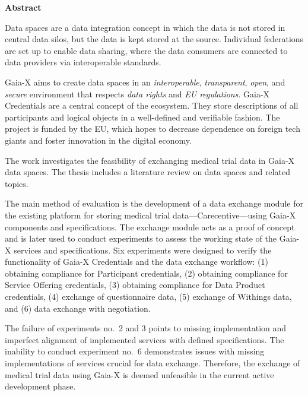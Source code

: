 \documentclass{maddoc}
\begin{document}
\vspace{5.0cm}

\begin{center}
\bfseries
Abstract
\normalfont
\end{center}

Data spaces are a data integration concept in which the data is not stored in central data silos, but the data is kept stored at the source.
Individual federations are set up to enable data sharing, where the data consumers are connected to data providers via interoperable standards.

Gaia-X aims to create data spaces in an \textit{interoperable}, \textit{transparent}, \textit{open}, and \textit{secure} environment that respects \textit{data rights} and \textit{EU regulations}.
Gaia-X Credentials are a central concept of the ecosystem.
They store descriptions of all participants and logical objects in a well-defined and verifiable fashion.
The project is funded by the EU, which hopes to decrease dependence on foreign tech giants and foster innovation in the digital economy.

The work investigates the feasibility of exchanging medical trial data in Gaia-X data spaces.
The thesis includes a literature review on data spaces and related topics.

The main method of evaluation is the development of a data exchange module for the existing platform for storing medical trial data---Carecentive---using Gaia-X components and specifications.
The exchange module acts as a proof of concept and is later used to conduct experiments to assess the working state of the Gaia-X services and specifications.
Six experiments were designed to verify the functionality of Gaia-X Credentials and the data exchange workflow: (1) obtaining compliance for Participant credentials, (2) obtaining compliance for Service Offering credentials, (3) obtaining compliance for Data Product credentials, (4) exchange of questionnaire data, (5) exchange of Withings data, and (6) data exchange with negotiation.

The failure of experiments no.~2 and 3 points to missing implementation and imperfect alignment of implemented services with defined specifications.
The inability to conduct experiment no.~6 demonstrates issues with missing implementations of services crucial for data exchange.
Therefore, the exchange of medical trial data using Gaia-X is deemed unfeasible in the current active development phase.


\tableofcontents
\cleardoublepage
\end{document}
